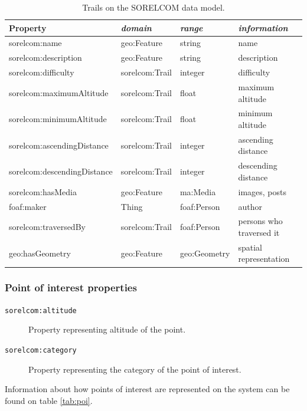 \begin{table}[ht]
  \centering
  \caption{Trails on the SORELCOM data model.}\label{tab:trail}
  \begin{tabular}{llll}
    \toprule
      \textbf{Property} & \emph{domain}  & \emph{range} & \emph{information}\\
    \midrule
      sorelcom:name & geo:Feature  & string & name \\
      sorelcom:description & geo:Feature & string  & description \\
      sorelcom:difficulty & sorelcom:Trail & integer & difficulty \\
      sorelcom:maximumAltitude & sorelcom:Trail & float & maximum altitude \\
      sorelcom:minimumAltitude & sorelcom:Trail & float & minimum altitude \\
      sorelcom:ascendingDistance & sorelcom:Trail & integer & ascending distance \\
      sorelcom:descendingDistance & sorelcom:Trail & integer & descending distance \\
      sorelcom:hasMedia & geo:Feature & ma:Media & images, posts \\
      foaf:maker & Thing & foaf:Person & author \\
      sorelcom:traversedBy & sorelcom:Trail & foaf:Person & persons who traversed it \\ 
      geo:hasGeometry & geo:Feature & geo:Geometry & spatial representation \\
    \bottomrule
  \end{tabular}
\end{table}

\subsubsection*{Point of interest properties}

\begin{description}
\item[\texttt{sorelcom:altitude}] Property representing altitude of the point. 
\item[\texttt{sorelcom:category}] Property representing the category of the point of interest.
\end{description}

Information about how points of interest are represented on the system can be found on table \ref{tab:poi}.

